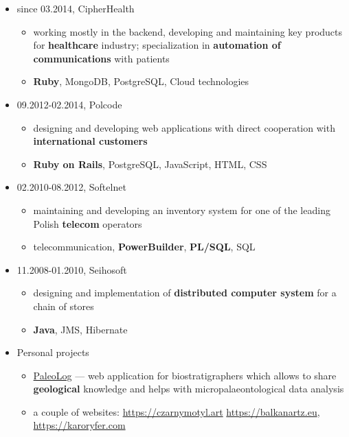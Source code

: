 \documentclass[a4paper]{article}
\begin{document}
\begin{itemize}
  \item
  since 03.2014,
  CipherHealth
  \begin{itemize}
    \item
      working mostly in the backend, developing and maintaining key products for \textbf{healthcare} industry; specialization in \textbf{automation of communications} with patients
    \item
      \textbf{Ruby}, MongoDB, PostgreSQL, Cloud technologies
  \end{itemize}
  \item
    09.2012-02.2014,
    Polcode
    \begin{itemize}
      \item
        designing and developing web applications with direct cooperation with \textbf{international customers}
      \item
        \textbf{Ruby on Rails}, PostgreSQL, JavaScript, HTML, CSS
    \end{itemize}
  \item
    02.2010-08.2012,
    Softelnet
    \begin{itemize}
      \item
        maintaining and developing an inventory system
        for one of the leading Polish \textbf{telecom} operators
      \item
        telecommunication, \textbf{PowerBuilder}, \textbf{PL/SQL}, SQL
    \end{itemize}
  \item
    11.2008-01.2010,
    Seihosoft
    \begin{itemize}
      \item
        designing and implementation of \textbf{distributed computer system}
        for a chain of stores
      \item
        \textbf{Java}, JMS, Hibernate
    \end{itemize}
  \item
    Personal projects
    \begin{itemize}
      \item
        \href{https://github.com/mradmacher/paleolog}{PaleoLog} --- web application for biostratigraphers which allows
        to share \textbf{geological} knowledge and helps with micropalaeontological data analysis
      \item
        a couple of websites: \href{https://czarnymotyl.art}{https://czarnymotyl.art} \href{https://balkanartz.eu}{https://balkanartz.eu}, \href{https://karoryfer.com}{https://karoryfer.com}
    \end{itemize}
\end{itemize}
\end{document}
